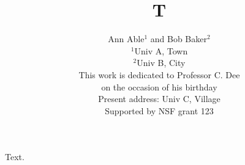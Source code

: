 \documentclass{article}
\title{T}
\author{Ann Able$^{1}$ and Bob Baker$^{2}$\\
$^1$Univ A, Town\\
$^2$Univ B, City\\
This work is dedicated to Professor C. Dee\\
on the occasion of his birthday\\
Present address: Univ C, Village\\
Supported by NSF grant 123}
\date{}
\begin{document}
\maketitle
Text.
\end{document}
